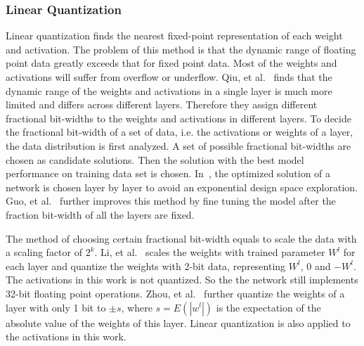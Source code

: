 \subsubsection{Linear Quantization}
Linear quantization finds the nearest fixed-point representation of each weight and activation. The problem of this method is that the dynamic range of floating point data greatly exceeds that for fixed point data. Most of the weights and activations will suffer from overflow or underflow. Qiu, et al.~\cite{qiu2016going} finds that the dynamic range of the weights and activations in a single layer is much more limited and differs across different layers. Therefore they assign different fractional bit-widths to the weights and activations in different layers. To decide the fractional bit-width of a set of data, i.e. the activations or weights of a layer, the data distribution is first analyzed. A set of possible fractional bit-widths are chosen as candidate solutions. Then the solution with the best model performance on training data set is chosen. In~\cite{qiu2016going}, the optimized solution of a network is chosen layer by layer to avoid an exponential design space exploration. Guo, et al.~\cite{guo2017angel} further improves this method by fine tuning the model after the fraction bit-width of all the layers are fixed.

The method of choosing certain fractional bit-width equals to scale the data with a scaling factor of $2^k$. Li, et al.~\cite{li2016ternary} scales the weights with trained parameter $W^l$ for each layer and quantize the weights with 2-bit data, representing $W^l$, 0 and $-W^l$. The activations in this work is not quantized. So the the network still implements 32-bit floating point operations. Zhou, et al.~\cite{zhou2016dorefa} further quantize the weights of a layer with only 1 bit to $\pm s$, where $s=E(|w^l|)$ is the expectation of the absolute value of the weights of this layer. Linear quantization is also applied to the activations in this work.

